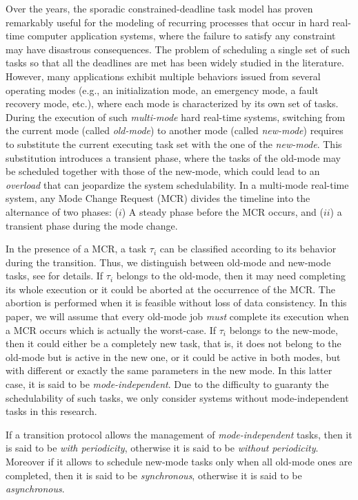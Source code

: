 \documentclass[10pt,english,a4paper]{article}
\newtheorem{validity test}{Validity Test}
\begin{document}
Over the years, the sporadic constrained-deadline task model \cite{Baruah0} has proven remarkably useful for the modeling of recurring processes that occur in hard real-time computer application systems, where the failure to satisfy any constraint may have disastrous consequences. The problem of scheduling a single set of such tasks so that all the deadlines are met has been widely studied in the literature. However, many applications exhibit multiple behaviors issued from several operating modes (e.g., an initialization mode, an emergency mode, a fault recovery mode, etc.), where each mode is characterized by its own set of tasks. During the execution of such {\em multi-mode} hard real-time systems, switching from the current mode (called {\em old-mode}) to another mode (called {\em new-mode}) requires to substitute the current executing task set with the one of the {\em new-mode}. This substitution introduces a transient phase, where the tasks of the old-mode may be scheduled together with those of the new-mode, which could lead to an {\em overload} that can jeopardize the system schedulability. In a multi-mode real-time system, any Mode Change Request (MCR) divides the timeline into the alternance of two phases: ($i$) A steady phase before the MCR occurs, and ($ii$) a transient phase during the mode change.

In the presence of a MCR, a task $\tau_i$ can be classified according to its behavior during the transition. Thus, we distinguish between old-mode and new-mode tasks, see \cite{Pedro} for details. If $\tau_i$ belongs to the old-mode, then it may need completing its whole execution or it could be aborted at the occurrence of the MCR. The abortion is performed when it is feasible without loss of data consistency. In this paper, we will assume that every old-mode job {\em must} complete its execution when a MCR occurs which is actually the worst-case. If $\tau_i$ belongs to the new-mode, then it could either be a completely new task, that is, it does not belong to the old-mode but is active in the new one, or it could be active in both modes, but with different or exactly the same parameters in the new mode. In this latter  case, it is said to be {\em mode-independent}. Due to the difficulty to guaranty the schedulability of such tasks, we only consider systems without mode-independent tasks in this research. 

If a transition protocol allows the management of {\em mode-independent} tasks, then it is said to be {\em with periodicity}, otherwise it is said to be {\em without periodicity}. Moreover if it allows to schedule new-mode tasks only when all old-mode ones are completed, then it is said to be {\em synchronous}, otherwise it is said to be {\em asynchronous}. 
\end{document}
